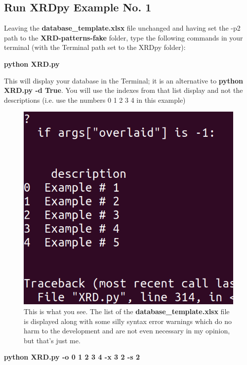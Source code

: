 \documentclass{article}
\begin{document}
\subsection{Run XRDpy Example No. 1}

Leaving the \textbf{database\_template.xlsx} file unchanged and having set the -p2 path to the \textbf{XRD-patterns-fake} folder, type the following commands in your terminal (with the Terminal path set to the XRDpy folder): 


\begin{description}
\item \textbf{python XRD.py}    

This will display your database in the Terminal; it is an alternative to \textbf{python XRD.py -d True}. You will use the indexes from that list display and not the descriptions (i.e. use the numbers 0 1 2 3 4 in this example)

\begin{figure}[htbp]
\centerline{\includegraphics[scale=.3]{database-display.png}}
\caption {This is what you see. The list of the \textbf{database\_template.xlsx} file is displayed along with some silly syntax error warnings which do no harm to the development and are not even necessary in my opinion, but that's just me.}
\label{fig6}
\end{figure}

\pagebreak 

\item \textbf{python XRD.py -o 0 1 2 3 4 -x 3 2 -s 2}  


\end{description}
\end{document}
